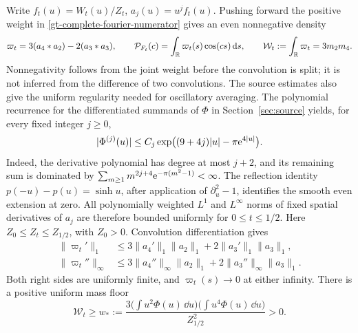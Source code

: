 Write \(f_t(u)=W_t(u)/Z_t\), \(a_j(u)=u^j f_t(u)\). Pushing forward the
positive weight in \eqref{gt-complete-fourier-numerator} gives an even
nonnegative density
\begin{equation}
 \varpi_t=3(a_4*a_2)-2(a_3*a_3),\qquad
 \mathcal P_{F_t}(c)=\int_\mathbb R\varpi_t(s)\cos(cs)\,\mathrm d s,
 \qquad \mathcal W_t:=\int_\mathbb R\varpi_t=3m_2m_4.
 \label{gt-fourier-product-density}
\end{equation}
Nonnegativity follows from the joint weight before the convolution is
split; it is not inferred from the difference of two convolutions.
The source estimates also give the uniform regularity needed for
oscillatory averaging. The polynomial recurrence for the differentiated
summands of \(\Phi\) in Section~\ref{sec:source} yields, for every fixed
integer \(j\ge0\),
\[
 |\Phi^{(j)}(u)|\le C_j\exp\bigl((9+4j)|u|-\pi\mathrm e^{4|u|}\bigr).
\]
Indeed, the derivative polynomial has degree at most \(j+2\), and its
remaining sum is dominated by
\(\sum_{m\ge1}m^{2j+4}\mathrm e^{-\pi(m^2-1)}<\infty\).
The reflection identity \(p(-u)-p(u)=\sinh u\), after application of
\(\partial_u^2-1\), identifies the smooth even extension at zero.
All polynomially weighted \(L^1\) and \(L^\infty\) norms of fixed
spatial derivatives of \(a_j\) are therefore bounded uniformly for
\(0\le t\le1/2\). Here \(Z_0\le Z_t\le Z_{1/2}\), with \(Z_0>0\).
Convolution differentiation gives
\begin{align*}
 \|\varpi_t'\|_1
 &\le3\|a_4'\|_1\|a_2\|_1+2\|a_3'\|_1\|a_3\|_1,\\
 \|\varpi_t''\|_\infty
 &\le3\|a_4''\|_\infty\|a_2\|_1
       +2\|a_3''\|_\infty\|a_3\|_1.
\end{align*}
Both right sides are uniformly finite, and \(\varpi_t(s)\to0\) at either
infinity. There is a positive uniform mass floor
\begin{equation}
 \mathcal W_t\ge w_*:=
 \frac{3\bigl(\int u^2\Phi(u)\,\dd u\bigr)
          \bigl(\int u^4\Phi(u)\,\dd u\bigr)}{Z_{1/2}^{2}}>0.
 \label{gt-fourier-mass-floor}
\end{equation}

